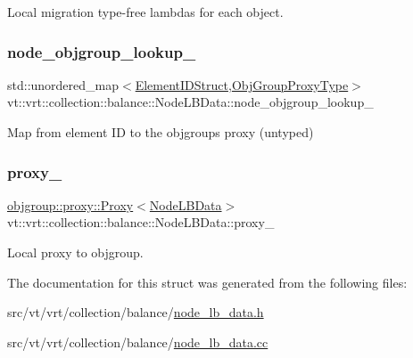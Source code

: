 Local migration type-\/free lambdas for each object. 

\mbox{\label{structvt_1_1vrt_1_1collection_1_1balance_1_1_node_l_b_data_a168baa5b6f532b6f37431ef4e7f7e48e}} 
\subsubsection{\texorpdfstring{node\+\_\+objgroup\+\_\+lookup\+\_\+}{node\_objgroup\_lookup\_}}
{\footnotesize\ttfamily std\+::unordered\+\_\+map$<$\hyperlink{namespacevt_1_1vrt_1_1collection_1_1balance_a9f5b53fafb270212279a4757d2c4cd28}{Element\+I\+D\+Struct},\hyperlink{namespacevt_ad7cae989df485fccca57f0792a880a8e}{Obj\+Group\+Proxy\+Type}$>$ vt\+::vrt\+::collection\+::balance\+::\+Node\+L\+B\+Data\+::node\+\_\+objgroup\+\_\+lookup\+\_\+\hspace{0.3cm}{\ttfamily [private]}}



Map from element ID to the objgroup\textquotesingle{}s proxy (untyped) 

\mbox{\label{structvt_1_1vrt_1_1collection_1_1balance_1_1_node_l_b_data_a72ce69b4edce524cd5960eb3ed856f26}} 
\subsubsection{\texorpdfstring{proxy\+\_\+}{proxy\_}}
{\footnotesize\ttfamily \hyperlink{structvt_1_1objgroup_1_1proxy_1_1_proxy}{objgroup\+::proxy\+::\+Proxy}$<$\hyperlink{structvt_1_1vrt_1_1collection_1_1balance_1_1_node_l_b_data}{Node\+L\+B\+Data}$>$ vt\+::vrt\+::collection\+::balance\+::\+Node\+L\+B\+Data\+::proxy\+\_\+\hspace{0.3cm}{\ttfamily [private]}}



Local proxy to objgroup. 



The documentation for this struct was generated from the following files\+:\begin{DoxyCompactItemize}
\item 
src/vt/vrt/collection/balance/\hyperlink{node__lb__data_8h}{node\+\_\+lb\+\_\+data.\+h}\item 
src/vt/vrt/collection/balance/\hyperlink{node__lb__data_8cc}{node\+\_\+lb\+\_\+data.\+cc}\end{DoxyCompactItemize}
